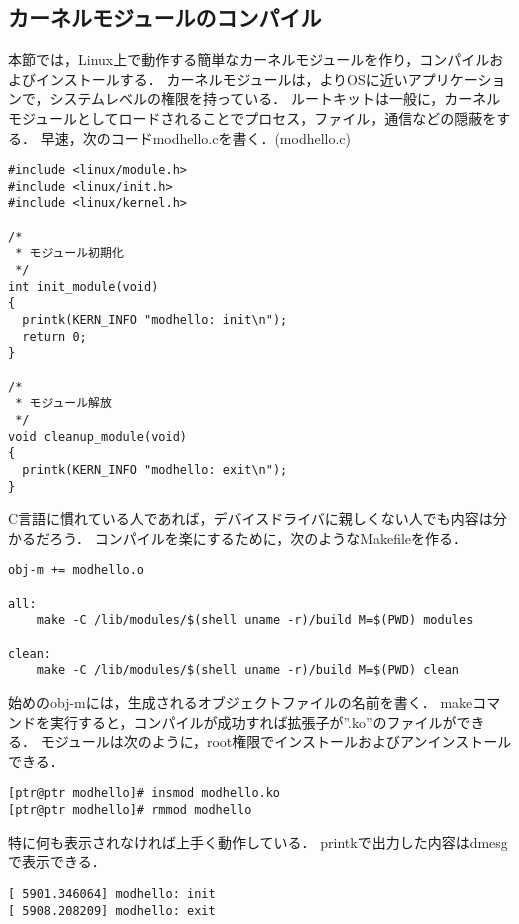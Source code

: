 \documentclass{jsarticle}
\begin{document}
  \subsection{カーネルモジュールのコンパイル}
  本節では，Linux上で動作する簡単なカーネルモジュールを作り，コンパイルおよびインストールする．
  カーネルモジュールは，よりOSに近いアプリケーションで，システムレベルの権限を持っている．
  ルートキットは一般に，カーネルモジュールとしてロードされることでプロセス，ファイル，通信などの隠蔽をする．
  早速，次のコードmodhello.cを書く．(modhello.c)
  \begin{lstlisting}[basicstyle=\ttfamily\footnotesize, frame=single]
#include <linux/module.h>
#include <linux/init.h>
#include <linux/kernel.h>

/*
 * モジュール初期化
 */
int init_module(void)
{
  printk(KERN_INFO "modhello: init\n");
  return 0;
}

/*
 * モジュール解放
 */
void cleanup_module(void)
{
  printk(KERN_INFO "modhello: exit\n");
}
  \end{lstlisting}
  C言語に慣れている人であれば，デバイスドライバに親しくない人でも内容は分かるだろう．
  コンパイルを楽にするために，次のようなMakefileを作る．
  \begin{lstlisting}[basicstyle=\ttfamily\footnotesize, frame=single]
obj-m += modhello.o

all:
    make -C /lib/modules/$(shell uname -r)/build M=$(PWD) modules

clean:
    make -C /lib/modules/$(shell uname -r)/build M=$(PWD) clean

  \end{lstlisting}
  始めのobj-mには，生成されるオブジェクトファイルの名前を書く．
  makeコマンドを実行すると，コンパイルが成功すれば拡張子が''.ko''のファイルができる．
  モジュールは次のように，root権限でインストールおよびアンインストールできる．
  \begin{lstlisting}[basicstyle=\ttfamily\footnotesize, frame=single]
[ptr@ptr modhello]# insmod modhello.ko
[ptr@ptr modhello]# rmmod modhello
  \end{lstlisting}
  特に何も表示されなければ上手く動作している．
  printkで出力した内容はdmesgで表示できる．
  \begin{lstlisting}[basicstyle=\ttfamily\footnotesize, frame=single]
[ 5901.346064] modhello: init
[ 5908.208209] modhello: exit
  \end{lstlisting}

\end{document}
